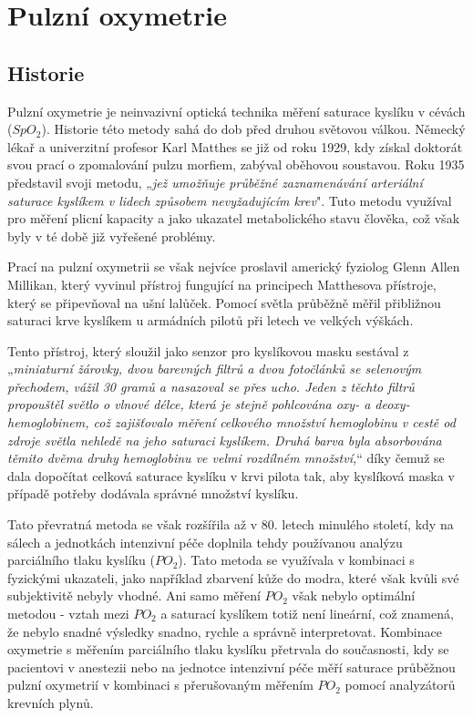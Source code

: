 \section {Pulzní oxymetrie}
\subsection {Historie}
Pulzní oxymetrie je neinvazivní optická technika měření saturace kyslíku v cévách ($SpO_2$). Historie této metody sahá do dob před druhou světovou válkou. Německý lékař a univerzitní profesor Karl Matthes se již od roku 1929, kdy získal doktorát svou prací o zpomalování pulzu morfiem, zabýval oběhovou soustavou. Roku 1935 představil svoji metodu, „\emph{jež umožňuje průběžné zaznamenávání arteriální saturace kyslíkem v lidech způsobem nevyžadujícím krev}". Tuto metodu využíval pro měření plicní kapacity a jako ukazatel metabolického stavu člověka, což však byly v té době již vyřešené problémy. \citep{matthes}
\par Prací na pulzní oxymetrii se však nejvíce proslavil americký fyziolog Glenn Allen Millikan, který vyvinul přístroj fungující na principech Matthesova přístroje, který se připevňoval na ušní lalůček. Pomocí světla průběžně měřil přibližnou saturaci krve kyslíkem u armádních pilotů při letech ve velkých výškách. \citep{TremperPulseOximetry}
\par Tento přístroj, který sloužil jako senzor pro kyslíkovou masku sestával z „\emph{miniaturní žárovky, dvou barevných filtrů a dvou fotočlánků se selenovým přechodem, vážil 30 gramů a nasazoval se přes ucho. Jeden z těchto filtrů propouštěl světlo o vlnové délce, která je stejně pohlcována oxy- a deoxy- hemoglobinem, což zajišťovalo měření celkového množství hemoglobinu v cestě od zdroje světla nehledě na jeho saturaci kyslíkem. Druhá barva byla absorbována těmito dvěma druhy hemoglobinu ve velmi rozdílném množství,}“ díky čemuž se dala dopočítat celková saturace kyslíku v krvi pilota tak, aby kyslíková maska v případě potřeby dodávala správné množství kyslíku. \citep{1942oximeter}
\par Tato převratná metoda se však rozšířila až v 80. letech minulého století, kdy na sálech a jednotkách intenzivní péče doplnila tehdy používanou analýzu parciálního tlaku kyslíku ($PO_2$). Tato metoda se využívala v kombinaci s fyzickými ukazateli, jako například zbarvení kůže do modra, které však kvůli své subjektivitě nebyly vhodné. Ani samo měření $PO_2$ však nebylo optimální metodou - vztah mezi $PO_2$ a saturací kyslíkem totiž není lineární, což znamená, že nebylo snadné výsledky snadno, rychle a správně interpretovat. Kombinace oxymetrie s měřením parciálního tlaku kyslíku přetrvala do současnosti, kdy se pacientovi v anestezii nebo na jednotce intenzivní péče měří saturace průběžnou pulzní oxymetrií v kombinaci s přerušovaným měřením $PO_2$ pomocí analyzátorů krevních plynů. \citep{KYRIACOU}
